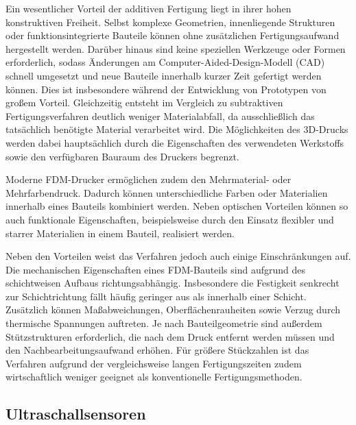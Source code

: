Ein wesentlicher Vorteil der additiven Fertigung liegt in ihrer hohen konstruktiven Freiheit. Selbst komplexe Geometrien, innenliegende Strukturen oder funktionsintegrierte Bauteile können ohne zusätzlichen Fertigungsaufwand hergestellt werden. Darüber hinaus sind keine speziellen Werkzeuge oder Formen erforderlich, sodass Änderungen am Computer-Aided-Design-Modell (CAD) schnell umgesetzt und neue Bauteile innerhalb kurzer Zeit gefertigt werden können. Dies ist insbesondere während der Entwicklung von Prototypen von großem Vorteil. Gleichzeitig entsteht im Vergleich zu subtraktiven Fertigungsverfahren deutlich weniger Materialabfall, da ausschließlich das tatsächlich benötigte Material verarbeitet wird. Die Möglichkeiten des 3D-Drucks werden dabei hauptsächlich durch die Eigenschaften des verwendeten Werkstoffs sowie den verfügbaren Bauraum des Druckers begrenzt.

Moderne FDM-Drucker ermöglichen zudem den Mehrmaterial- oder Mehrfarbendruck. Dadurch können unterschiedliche Farben oder Materialien innerhalb eines Bauteils kombiniert werden. Neben optischen Vorteilen können so auch funktionale Eigenschaften, beispielsweise durch den Einsatz flexibler und starrer Materialien in einem Bauteil, realisiert werden. \cite{gibson2021additive} 

Neben den Vorteilen weist das Verfahren jedoch auch einige Einschränkungen auf. Die mechanischen Eigenschaften eines FDM-Bauteils sind aufgrund des schichtweisen Aufbaus richtungsabhängig. Insbesondere die Festigkeit senkrecht zur Schichtrichtung fällt häufig geringer aus als innerhalb einer Schicht. Zusätzlich können Maßabweichungen, Oberflächenrauheiten sowie Verzug durch thermische Spannungen auftreten. \cite{gibson2021additive} Je nach Bauteilgeometrie sind außerdem Stützstrukturen erforderlich, die nach dem Druck entfernt werden müssen und den Nachbearbeitungsaufwand erhöhen. Für größere Stückzahlen ist das Verfahren aufgrund der vergleichsweise langen Fertigungszeiten zudem wirtschaftlich weniger geeignet als konventionelle Fertigungsmethoden. \cite{gibson2021additive}

\subsection{Ultraschallsensoren}

